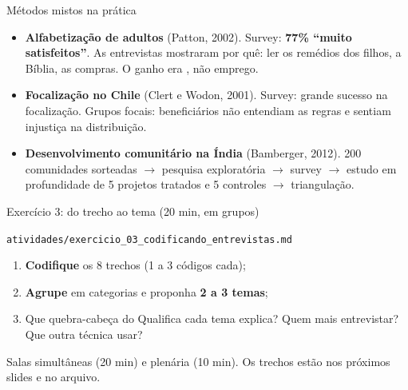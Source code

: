 \begin{frame}{Métodos mistos na prática}
  \footnotesize
  \begin{itemize}
    \item \textbf{Alfabetização de adultos} (Patton, 2002). Survey: \textbf{77\% ``muito satisfeitos''}. As entrevistas mostraram por quê: ler os remédios dos filhos, a Bíblia, as compras. O ganho era , não emprego.
    \item \textbf{Focalização no Chile} (Clert e Wodon, 2001). Survey: grande sucesso na focalização. Grupos focais: beneficiários não entendiam as regras e sentiam \alert{injustiça} na distribuição.
    \item \textbf{Desenvolvimento comunitário na Índia} (Bamberger, 2012). 200 comunidades sorteadas $\to$ pesquisa exploratória $\to$ survey $\to$ estudo em profundidade de 5 projetos tratados e 5 controles $\to$ triangulação.
  \end{itemize}
\end{frame}

\begin{frame}{Exercício 3: do trecho ao tema (20 min, em grupos)}
  \begin{exerciciobox}{\texttt{atividades/exercicio\_03\_codificando\_entrevistas.md}}
    \small
    \begin{enumerate}
      \item \textbf{Codifique} os 8 trechos (1 a 3 códigos cada);
      \item \textbf{Agrupe} em categorias e proponha \textbf{2 a 3 temas};
      \item Que quebra-cabeça do Qualifica cada tema explica? Quem mais entrevistar? Que outra técnica usar?
    \end{enumerate}
  \end{exerciciobox}
  \vspace{0.2cm}
  \small Salas simultâneas (20 min) e plenária (10 min). Os trechos estão nos próximos slides e no arquivo.
\end{frame}

